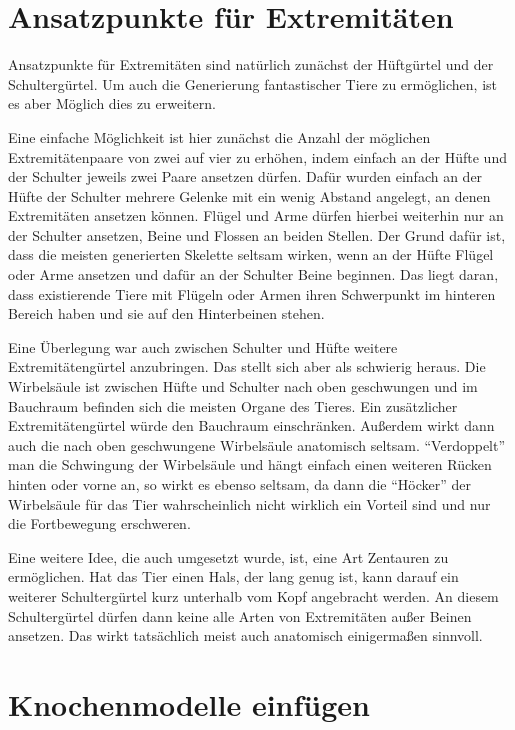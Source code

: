 \section{Ansatzpunkte für Extremitäten}

Ansatzpunkte für Extremitäten sind natürlich zunächst der Hüftgürtel und der Schultergürtel. Um auch die Generierung fantastischer Tiere zu ermöglichen, ist es aber Möglich dies zu erweitern.

Eine einfache Möglichkeit ist hier zunächst die Anzahl der möglichen Extremitätenpaare von zwei auf vier zu erhöhen, indem einfach an der Hüfte und der Schulter jeweils zwei Paare ansetzen dürfen. Dafür wurden einfach an der Hüfte \bzw der Schulter mehrere Gelenke mit ein wenig Abstand angelegt, an denen Extremitäten ansetzen können.
Flügel und Arme dürfen hierbei weiterhin nur an der Schulter ansetzen, Beine und Flossen an beiden Stellen. Der Grund dafür ist, dass die meisten generierten Skelette seltsam wirken, wenn an der Hüfte Flügel oder Arme ansetzen und dafür an der Schulter Beine beginnen. Das liegt daran, dass existierende Tiere mit Flügeln oder Armen ihren Schwerpunkt im hinteren Bereich haben und sie auf den Hinterbeinen stehen.

Eine Überlegung war auch zwischen Schulter und Hüfte weitere Extremitätengürtel anzubringen. Das stellt sich aber als schwierig heraus. Die Wirbelsäule ist zwischen Hüfte und Schulter nach oben geschwungen und im Bauchraum befinden sich die meisten Organe des Tieres. Ein zusätzlicher Extremitätengürtel würde den Bauchraum einschränken. Außerdem wirkt dann auch die nach oben geschwungene Wirbelsäule anatomisch seltsam.
"`Verdoppelt"' man die Schwingung der Wirbelsäule und hängt einfach einen weiteren Rücken hinten oder vorne an, so wirkt es ebenso seltsam, da dann die "`Höcker"' der Wirbelsäule für das Tier wahrscheinlich nicht wirklich ein Vorteil sind und nur die Fortbewegung erschweren.

Eine weitere Idee, die auch umgesetzt wurde, ist, eine Art Zentauren zu ermöglichen. Hat das Tier einen Hals, der lang genug ist, kann darauf ein weiterer Schultergürtel kurz unterhalb vom Kopf angebracht werden. An diesem Schultergürtel dürfen dann keine alle Arten von Extremitäten außer Beinen ansetzen. Das wirkt tatsächlich meist auch anatomisch einigermaßen sinnvoll.


\section{Knochenmodelle einfügen}

